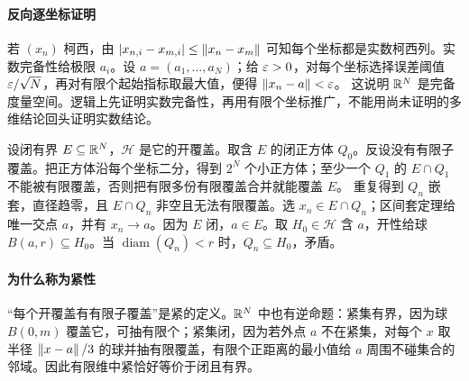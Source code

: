 \paragraph{反向逐坐标证明}若 $(x_n)$ 柯西，由 $|x_{n,i}-x_{m,i}|\le\left\lVert x_n-x_m\right\rVert$ 可知每个坐标都是实数柯西列。实数完备性给极限 $a_i$。设 $a=(a_1,\ldots,a_N)$；给 $\varepsilon>0$，对每个坐标选择误差阈值 $\varepsilon/\sqrt N$，再对有限个起始指标取最大值，便得 $\left\lVert x_n-a\right\rVert<\varepsilon$。
这说明 $\mathbb{R}^N$ 是完备度量空间。逻辑上先证明实数完备性，再用有限个坐标推广，不能用尚未证明的多维结论回头证明实数结论。

设闭有界 $E\subseteq\mathbb{R}^N$，$\mathcal H$ 是它的开覆盖。取含 $E$ 的闭正方体 $Q_0$。反设没有有限子覆盖。把正方体沿每个坐标二分，得到 $2^N$ 个小正方体；至少一个 $Q_1$ 的 $E\cap Q_1$ 不能被有限覆盖，否则把有限多份有限覆盖合并就能覆盖 $E$。
重复得到 $Q_n$ 嵌套，直径趋零，且 $E\cap Q_n$ 非空且无法有限覆盖。选 $x_n\in E\cap Q_n$；区间套定理给唯一交点 $a$，并有 $x_n\to a$。因为 $E$ 闭，$a\in E$。取 $H_0\in\mathcal H$ 含 $a$，开性给球 $B(a,r)\subseteq H_0$。当 $\operatorname{diam}(Q_n)<r$ 时，$Q_n\subseteq H_0$，矛盾。
\paragraph{为什么称为紧性}“每个开覆盖有有限子覆盖”是紧的定义。$\mathbb{R}^N$ 中也有逆命题：紧集有界，因为球 $B(0,m)$ 覆盖它，可抽有限个；紧集闭，因为若外点 $a$ 不在紧集，对每个 $x$ 取半径 $\left\lVert x-a\right\rVert/3$ 的球并抽有限覆盖，有限个正距离的最小值给 $a$ 周围不碰集合的邻域。因此有限维中紧恰好等价于闭且有界。